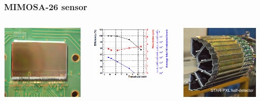 \documentclass{beamer}
\begin{document}
\begin{frame}
\begin{columns}[t]
  \end{columns}

\end{frame}


\begin{frame}
  \frametitle{MIMOSA-26 sensor}

  \vspace{-0.5cm}
  \begin{columns}[c]
    \begin{column}{4cm}
      \begin{center}
        \includegraphics[width = 4.0cm,height=3.6cm]{Pictures/mi26.jpg}
      \end{center}
    \end{column}

    \begin{column}{4cm}
      \begin{center}
        \includegraphics[width = 4.0cm]{Pictures/MIMOSA26_chip26_HR15_20deg.png}

      \end{center}
    \end{column}
    \begin{column}{4cm}
      \begin{center}
        \includegraphics[width = 4.0cm, height=3.6cm]{Pictures/pxlFinal_sideView_smallSize.jpg}
      \end{center}
    \end{column}
  \end{columns}


\end{frame}
\end{document}
